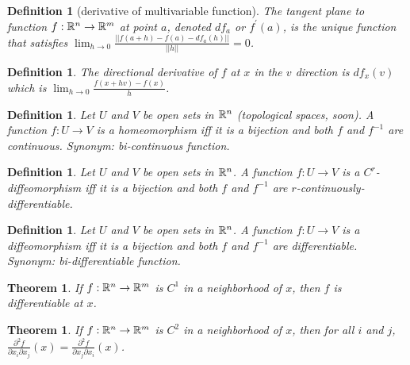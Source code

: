 \documentclass[11pt,leqno,oneside]{amsart}
\theoremstyle{mystyle} \newtheorem{thrm}[thm]{Theorem}
\theoremstyle{mystyle} \newtheorem{defi}[thm]{Definition}
\begin{document}
\begin{defi}[derivative of multivariable function]
	The \emph{tangent plane} to function $f : {\mathbb R}^n \to {\mathbb R}^m$ at point $a$, denoted $df_a$ or $f^{\prime}(a)$, is the unique function that satisfies $\lim_{h\to 0} \frac{||f(a+h) - f(a) - df_a(h)||}{||h||} = 0$.
\end{defi}
\begin{defi}
	The \emph{directional derivative} of $f$ at $x$ in the $v$ direction is $df_x(v)$ which is $\lim_{h\to 0} \frac{f(x+hv) - f(x)}{h}$.
\end{defi}
\begin{defi}
	Let $U$ and $V$ be open sets in ${\mathbb R}^n$ (topological spaces, soon).  A function $f:U\to V$ is a \emph{homeomorphism} iff it is a bijection and both $f$ and $f^{-1}$ are continuous.
	Synonym: bi-continuous function.
\end{defi}
\begin{defi}
	Let $U$ and $V$ be open sets in ${\mathbb R}^n$.  A function $f:U\to V$ is a \emph{$C^r$-diffeomorphism} iff it is a bijection and both $f$ and $f^{-1}$ are $r$-continuously-differentiable.
\end{defi}
\begin{defi}
	Let $U$ and $V$ be open sets in ${\mathbb R}^n$.  A function $f:U\to V$ is a \emph{diffeomorphism} iff it is a bijection and both $f$ and $f^{-1}$ are differentiable.
	Synonym: bi-differentiable function.
\end{defi}
\begin{thrm}
	If $f:{\mathbb R}^n \to {\mathbb R}^m$ is $C^1$ in a neighborhood of $x$, then $f$ is differentiable at $x$.
\end{thrm}
\begin{thrm}
	If $f:{\mathbb R}^n \to {\mathbb R}^m$ is $C^2$ in a neighborhood of $x$, then for all $i$ and $j$, $\frac{\partial^2f}{\partial x_i \partial x_j}(x) = \frac{\partial^2f}{\partial x_j \partial x_i}(x)$.
\end{thrm}
\end{document}

